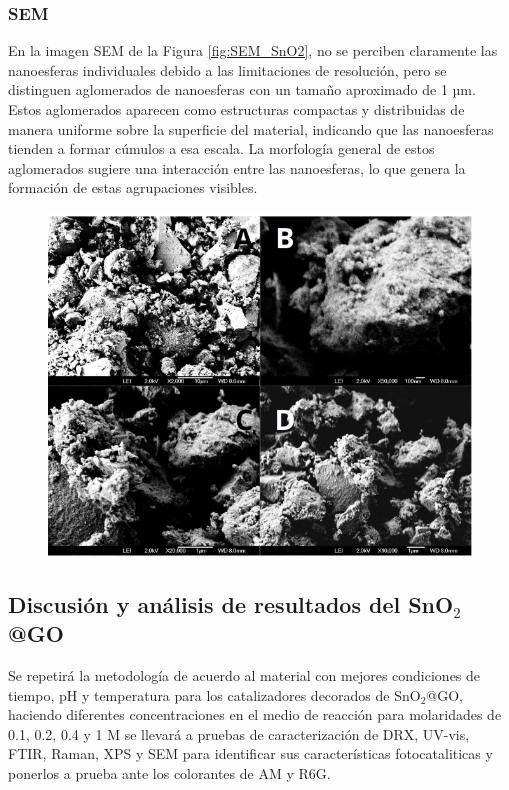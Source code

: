\documentclass[12pt]{article}
\begin{document}
\subsubsection{SEM} 
En la imagen SEM de la Figura \ref{fig:SEM_SnO2}, no se perciben claramente las nanoesferas individuales debido a las limitaciones de resolución, pero se distinguen aglomerados de nanoesferas con un tamaño aproximado de 1 µm. Estos aglomerados aparecen como estructuras compactas y distribuidas de manera uniforme sobre la superficie del material, indicando que las nanoesferas tienden a formar cúmulos a esa escala. La morfología general de estos aglomerados sugiere una interacción entre las nanoesferas, lo que genera la formación de estas agrupaciones visibles.
        \begin{figure}[H]
    	   \begin{center}
     	  	\includegraphics[width = 1\textwidth]{Imagenes/SEM_SnO230.png}
    	   \end{center} 
        \end{figure}

        
\subsection{Discusión y análisis de resultados del SnO$\displaystyle _{2}$@GO}


Se repetirá la metodología de acuerdo al material con mejores condiciones de tiempo, pH y temperatura para los catalizadores decorados de SnO$\displaystyle _{2}$@GO, haciendo diferentes concentraciones en el medio de reacción para molaridades de 0.1, 0.2, 0.4 y 1 M se llevará a pruebas de caracterización de DRX, UV-vis, FTIR, Raman, XPS y SEM para identificar sus características fotocataliticas y ponerlos a prueba ante los colorantes de AM y R6G.\vspace{1em} %
\end{document}
